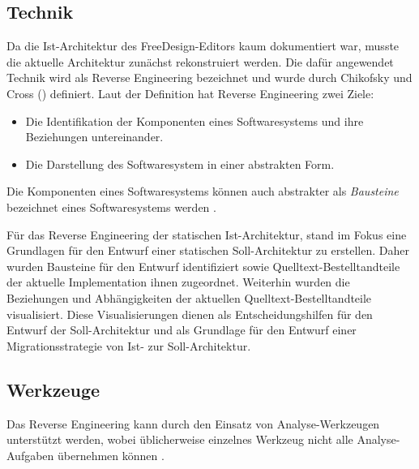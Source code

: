 \subsection{Technik}
Da die Ist-Architektur des FreeDesign-Editors kaum dokumentiert war, musste die aktuelle Architektur zunächst rekonstruiert werden. 
Die dafür angewendet Technik wird als Reverse Engineering bezeichnet und wurde durch Chikofsky und Cross (\citeyear[S. 13-17]{Chikofsky1990}) definiert. Laut der Definition hat Reverse Engineering zwei Ziele: 
\begin{itemize}
    \item Die Identifikation der Komponenten eines Softwaresystems und ihre Beziehungen untereinander. 
    \item Die Darstellung des Softwaresystem in einer abstrakten Form. 
\end{itemize}

Die Komponenten eines Softwaresystems können auch abstrakter als \emph{Bausteine} bezeichnet eines Softwaresystems werden \autocite[vgl.][24]{Starke2011}. 

Für das Reverse Engineering der statischen Ist-Architektur, stand im Fokus eine Grundlagen für den Entwurf einer statischen Soll-Architektur zu erstellen. Daher wurden Bausteine für den Entwurf identifiziert sowie Quelltext-Bestelltandteile der aktuelle Implementation ihnen zugeordnet. Weiterhin wurden die Beziehungen und Abhängigkeiten der aktuellen Quelltext-Bestelltandteile visualisiert. Diese Visualisierungen dienen als Entscheidungshilfen für den Entwurf der Soll-Architektur und als Grundlage für den Entwurf einer Migrationsstrategie von Ist- zur Soll-Architektur.

\subsection{Werkzeuge}
Das Reverse Engineering kann durch den Einsatz von Analyse-Werkzeugen unterstützt werden, wobei üblicherweise einzelnes Werkzeug nicht alle Analyse-Aufgaben übernehmen können \autocite[vgl.][381]{Bass2013}. 


